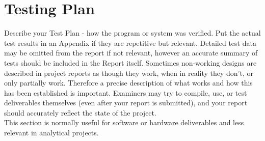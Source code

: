 \section{Testing Plan}
Describe your Test Plan - how the program or system
was verified. Put the actual test results in an Appendix if they are repetitive but relevant. Detailed test data
may be omitted from the report if not relevant,
however an accurate summary of tests should be
included in the Report itself. Sometimes non-working
designs are described in project reports as though
they work, when in reality they don't, or only partially
work. Therefore a precise description of what works
and how this has been established is important.
Examiners may try to compile, use, or test
deliverables themselves (even after your report is
submitted), and your report should accurately reflect
the state of the project.\\ \newline \noindent This section is normally useful for software or
hardware deliverables and less relevant in analytical
projects.
